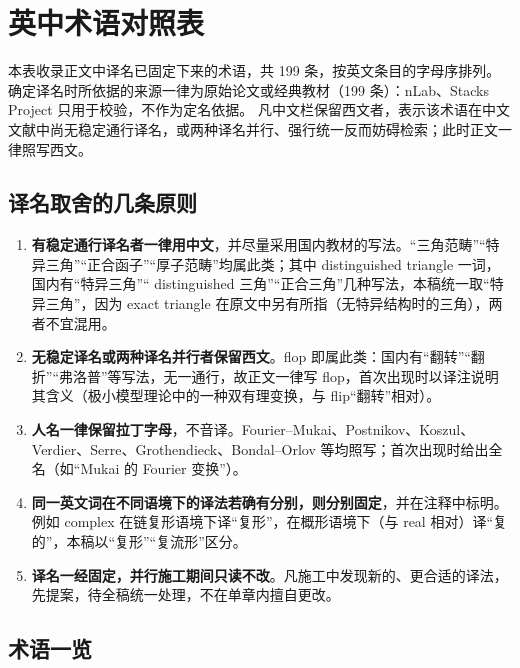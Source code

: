 \chapter{英中术语对照表}
\label{app:terms}

本表收录正文中译名已固定下来的术语，共 199 条，按英文条目的字母序排列。
确定译名时所依据的来源一律为原始论文或经典教材（199 条）：nLab、Stacks Project 只用于校验，不作为定名依据。
凡中文栏保留西文者，表示该术语在中文文献中尚无稳定通行译名，或两种译名并行、强行统一反而妨碍检索；此时正文一律照写西文。

\section{译名取舍的几条原则}

\begin{enumerate}
  \item \textbf{有稳定通行译名者一律用中文}，并尽量采用国内教材的写法。“三角范畴”“特异三角”“正合函子”“厚子范畴”均属此类；其中 distinguished triangle 一词，国内有“特异三角”“ distinguished 三角”“正合三角”几种写法，本稿统一取“特异三角”，因为 exact triangle 在原文中另有所指（无特异结构时的三角），两者不宜混用。
  \item \textbf{无稳定译名或两种译名并行者保留西文}。flop 即属此类：国内有“翻转”“翻折”“弗洛普”等写法，无一通行，故正文一律写 flop，首次出现时以译注说明其含义（极小模型理论中的一种双有理变换，与 flip“翻转”相对）。
  \item \textbf{人名一律保留拉丁字母}，不音译。Fourier--Mukai、Postnikov、Koszul、Verdier、Serre、Grothendieck、Bondal--Orlov 等均照写；首次出现时给出全名（如“Mukai 的 Fourier 变换”）。
  \item \textbf{同一英文词在不同语境下的译法若确有分别，则分别固定}，并在注释中标明。例如 complex 在链复形语境下译“复形”，在概形语境下（与 real 相对）译“复的”，本稿以“复形”“复流形”区分。
  \item \textbf{译名一经固定，并行施工期间只读不改}。凡施工中发现新的、更合适的译法，先提案，待全稿统一处理，不在单章内擅自更改。
\end{enumerate}

\section{术语一览}


